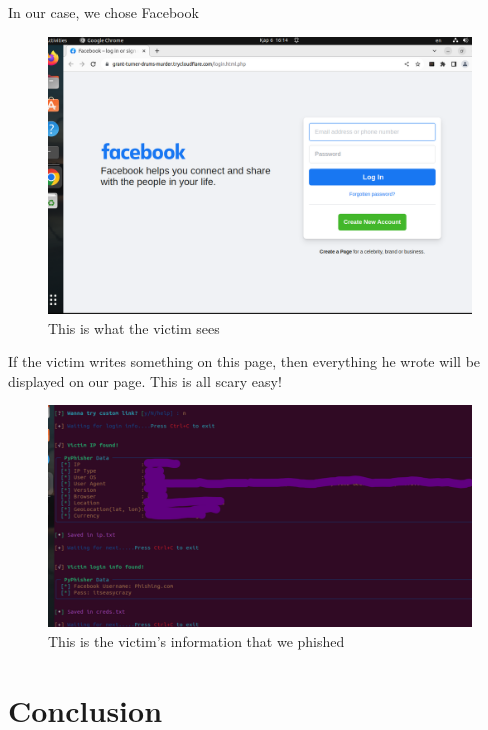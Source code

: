 \documentclass[conference]{IEEEtran}
\begin{document}
In our case, we chose Facebook


\begin{figure}[htbp]
\centerline{
\includegraphics[scale = 0.2]{facebook.png}
}
\caption{This is what the victim sees}
\label{fig}
\end{figure}

If the victim writes something on this page, then everything he wrote will be displayed on our page. This is all scary easy!

\begin{figure}[htbp]
\centerline{
\includegraphics[scale = 0.2]{information.png}
}
\caption{This is the victim's information that we phished}
\label{fig}
\end{figure}


\section{Conclusion}
\end{document}
